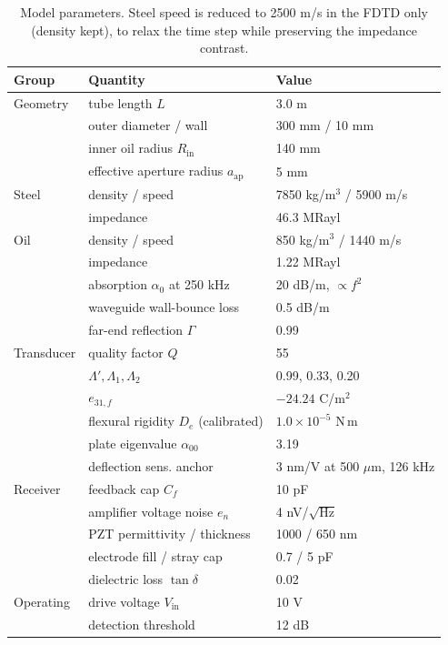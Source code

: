 \begin{table}[h]
\centering\small
\begin{tabular}{lll}
\toprule
Group & Quantity & Value \\
\midrule
Geometry & tube length $L$ & 3.0 m \\
         & outer diameter / wall & 300 mm / 10 mm \\
         & inner oil radius $R_{\mathrm{in}}$ & 140 mm \\
         & effective aperture radius $a_{\mathrm{ap}}$ & 5 mm \\
Steel    & density / speed & 7850 kg/m$^3$ / 5900 m/s \\
         & impedance & 46.3 MRayl \\
Oil      & density / speed & 850 kg/m$^3$ / 1440 m/s \\
         & impedance & 1.22 MRayl \\
         & absorption $\alpha_0$ at 250 kHz & 20 dB/m, $\propto f^2$ \\
         & waveguide wall-bounce loss & 0.5 dB/m \\
         & far-end reflection $\Gamma$ & 0.99 \\
Transducer & quality factor $Q$ & 55 \\
         & $\Lambda', \Lambda_1, \Lambda_2$ & 0.99, 0.33, 0.20 \\
         & $e_{31,f}$ & $-24.24$ C/m$^2$ \\
         & flexural rigidity $D_e$ (calibrated) & $1.0\times10^{-5}$ N\,m \\
         & plate eigenvalue $\alpha_{00}$ & 3.19 \\
         & deflection sens. anchor & 3 nm/V at 500 $\mu$m, 126 kHz \\
Receiver & feedback cap $C_f$ & 10 pF \\
         & amplifier voltage noise $e_n$ & 4 nV/$\sqrt{\text{Hz}}$ \\
         & PZT permittivity / thickness & 1000 / 650 nm \\
         & electrode fill / stray cap & 0.7 / 5 pF \\
         & dielectric loss $\tan\delta$ & 0.02 \\
Operating & drive voltage $V_{\mathrm{in}}$ & 10 V \\
          & detection threshold & 12 dB \\
\bottomrule
\end{tabular}
\caption{Model parameters. Steel speed is reduced to 2500 m/s in the FDTD only (density kept),
to relax the time step while preserving the impedance contrast.}
\end{table}

